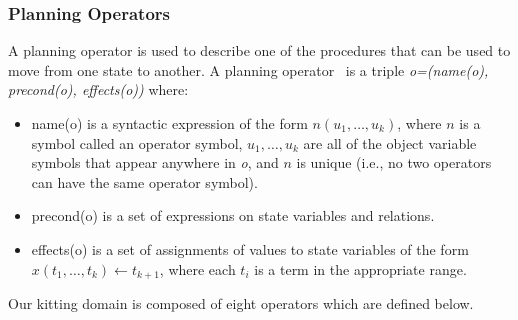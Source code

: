\subsubsection{Planning Operators}
A planning operator is used to describe one of the procedures that can be used to move from one state to another. A planning operator~\cite{NAU.2004} is a triple \textit{o=(name(o), precond(o), effects(o))}
where:
\begin{itemize}
\item name(o) is a syntactic expression of the form $n(u_1,\dots,u_k)$, where $n$ is a symbol
called an operator symbol, $u_1,\dots,u_k$ are all of the object variable symbols that
appear anywhere in \textit{o}, and $n$ is unique (i.e., no two operators can have the
same operator symbol).
\item precond(o) is a set of expressions on state variables and relations.
\item effects(o) is a set of assignments of values to state variables of the form
$x(t_1,\dots,t_k)\leftarrow t_{k+1}$, where each $t_i$ is a term in the appropriate range.
\end{itemize}

Our kitting domain is composed of eight operators which are defined below.


